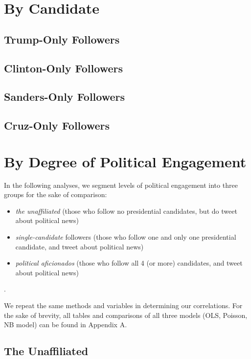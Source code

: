 \section{By Candidate} 

\subsection{Trump-Only Followers}


\subsection{Clinton-Only Followers}
 

\subsection{Sanders-Only Followers}


\subsection{Cruz-Only Followers}




\section{By Degree of Political Engagement}


In the following analyses, we segment levels of political engagement into three groups for the sake of comparison:

\begin{itemize}
  \item \emph{the unaffiliated} (those who follow no presidential candidates, but do tweet about political news)
  \item \emph{single-candidate} followers (those who follow one and only one presidential candidate, and tweet about political news)
  \item \emph{political aficionados} (those who follow all 4 (or more) candidates, and tweet about political news)
\end{itemize}.

We repeat the same methods and variables in determining our correlations. For the sake of brevity, all tables and comparisons of all three models (OLS, Poisson, NB model) can be found in Appendix A.

\subsection{The Unaffiliated}



